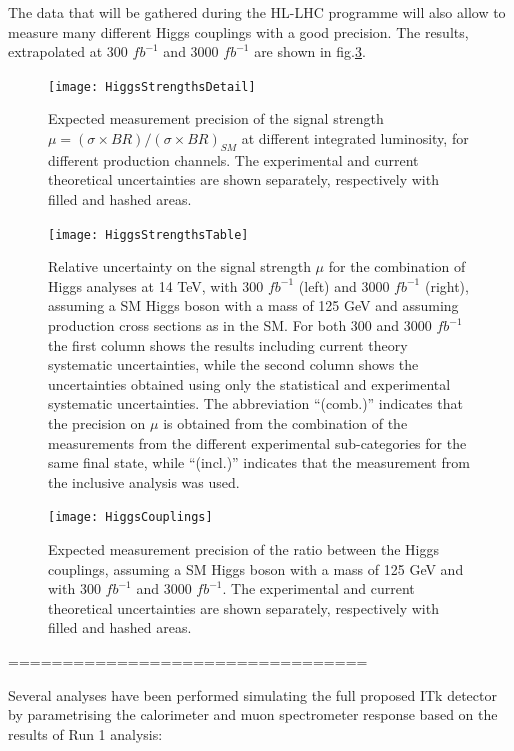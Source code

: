 \documentclass[a4paper,twoside,12pt]{article}
\begin{document}
The data that will be gathered during the HL-LHC programme will also allow to
measure many different Higgs couplings with a good precision. The results, extrapolated
at 300 $fb^{-1}$ and 3000 $fb^{-1}$ are shown in fig.\ref{fig:higgsCouplings}.



\begin{figure} [h]
	\centering
	\texttt{[image: HiggsStrengthsDetail]}
	\caption{Expected measurement precision of the signal strength $\mu = (\sigma \times BR)/(\sigma \times BR)_{SM}$\cite{loi} at different integrated luminosity, for different
	production channels. The experimental and current theoretical uncertainties are shown separately, respectively with filled and hashed areas.}
	\label{fig:HiggsStrengths}
\end{figure}

\begin{figure} [h]
	\centering
	\texttt{[image: HiggsStrengthsTable]}
	\caption{Relative uncertainty on the signal strength $\mu$ for the combination of Higgs analyses at 14 TeV,
with 300 $fb^{-1}$ (left) and 3000 $fb^{-1}$ (right), assuming a SM Higgs boson with a mass of 125 GeV and
assuming production cross sections as in the SM. For both 300 and 3000 $fb^{-1}$ the first column shows
the results including current theory systematic uncertainties, while the second column shows the uncertainties obtained using only the statistical and experimental systematic uncertainties. The abbreviation
“(comb.)” indicates that the precision on $\mu$ is obtained from the combination of the measurements from
the different experimental sub-categories for the same final state, while “(incl.)” indicates that the measurement from the inclusive analysis was used\cite{higgsCouplings}.}
	\label{fig:HiggsTable}
\end{figure}

\begin{figure} [h]
	\centering
	\texttt{[image: HiggsCouplings]}
	\caption{Expected measurement precision of the ratio between the
	Higgs couplings, assuming a SM Higgs boson with a mass of 125 GeV and with 
	300 $fb^{-1}$ and 3000 $fb^{-1}$. The experimental and current theoretical uncertainties are shown separately, respectively with filled and hashed areas.}
	\label{fig:higgsCouplings}
\end{figure}


=================================

Several analyses have been performed simulating the full proposed ITk detector by
parametrising the calorimeter and muon spectrometer response based on the results of
Run 1 analysis\cite{loi}\cite{scoping}:
\end{document}
